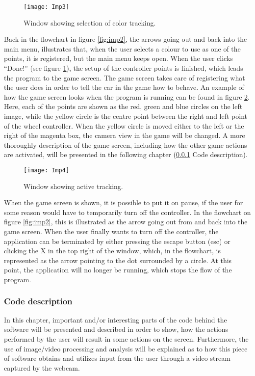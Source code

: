 \begin{figure}[!htbp]
\centering
\texttt{[image: Imp3]}
\caption{Window showing selection of color tracking.} 
\label{fig:imp3}
\end{figure}

Back in the flowchart in figure \ref{fig:imp2}, the arrows going out and back into the main menu, illustrates that, when the user selects a colour to use as one of the points, it is registered, but the main menu keeps open. 
When the user clicks “Done!” (see figure \ref{fig:imp3}), the setup of the controller points is finished, which leads the program to the game screen. 
The game screen takes care of registering what the user does in order to tell the car in the game how to behave. 
An example of how the game screen looks when the program is running can be found in figure \ref{fig:imp4}. 
Here, each of the points are shown as the red, green and blue circles on the left image, while the yellow circle is the centre point between the right and left point of the wheel controller. When the yellow circle is moved either to the left or the right of the magenta box, the camera view in the game will be changed. 
A more thoroughly description of the game screen, including how the other game actions are activated, will be presented in the following chapter (\ref{sec:codedesc} Code description).
\bigskip

\begin{figure}[!htbp]
\centering
\texttt{[image: Imp4]}
\caption{Window showing active tracking.} 
\label{fig:imp4}
\end{figure}

When the game screen is shown, it is possible to put it on pause, if the user for some reason would have to temporarily turn off the controller. 
In the flowchart on figure \ref{fig:imp2}, this is illustrated as the arrow going out from and back into the game screen. 
When the user finally wants to turn off the controller, the application can be terminated by either pressing the escape button (esc) or clicking the X in the top right of the window, which, in the flowchart, is represented as the arrow pointing to the dot surrounded by a circle. 
At this point, the application will no longer be running, which stops the flow of the program.

\subsubsection{Code description} \label{sec:codedesc}
In this chapter, important and/or interesting parts of the code behind the software will be presented and described in order to show, how the actions performed by the user will result in some actions on the screen. 
Furthermore, the use of image/video processing and analysis will be explained as to how this piece of software obtains and utilizes input from the user through a video stream captured by the webcam.

